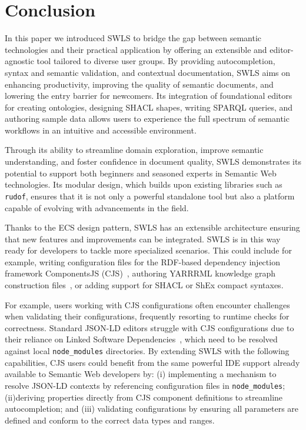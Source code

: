 \section{Conclusion}%
\label{sec:conclusion}

In this paper we introduced SWLS to bridge the gap between semantic technologies and their practical application by offering an extensible and editor-agnostic tool tailored to diverse user groups.
By providing autocompletion, syntax and semantic validation, and contextual documentation, SWLS aims on enhancing productivity, improving the quality of semantic documents, and lowering the entry barrier for newcomers.
Its integration of foundational editors for creating ontologies, designing SHACL shapes, writing SPARQL queries, and authoring sample data allows users to experience the full spectrum of semantic workflows in an intuitive and accessible environment.

Through its ability to streamline domain exploration, improve semantic understanding, and foster confidence in document quality, SWLS demonstrates its potential to support both beginners and seasoned experts in Semantic Web technologies.
Its modular design, which builds upon existing libraries such as \texttt{rudof}, ensures that it is not only a powerful standalone tool but also a platform capable of evolving with advancements in the field.

Thanks to the ECS design pattern, SWLS has an extensible architecture ensuring that new features and improvements can be integrated.
SWLS is in this way ready for developers to tackle more specialized scenarios.
This could include for example, writing configuration files for the RDF-based dependency injection framework ComponentsJS (CJS)~\cite{01GPAWNQ5ZS2DAY0J9JMPQHM9C}, authoring YARRRML knowledge graph construction files~\cite{Heyvaert2018Declarative}, or adding support for SHACL or ShEx compact syntaxes.

For example, users working with CJS configurations often encounter challenges when validating their configurations, frequently resorting to runtime checks for correctness.
Standard JSON-LD editors struggle with CJS configurations due to their reliance on Linked Software Dependencies~\cite{CJS2}, which need to be resolved against local \texttt{node\_modules} directories.
By extending SWLS with the following capabilities, CJS users could benefit from the same powerful IDE support already available to Semantic Web developers by: (i) implementing a mechanism to resolve JSON-LD contexts by referencing configuration files in \texttt{node\_modules}; (ii)deriving properties directly from CJS component definitions to streamline autocompletion; and (iii) validating configurations by ensuring all parameters are defined and conform to the correct data types and ranges.

